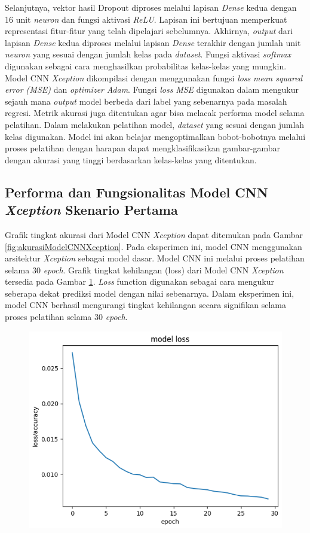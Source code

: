 Selanjutnya, vektor hasil Dropout diproses melalui lapisan \textit{Dense} kedua dengan 16 unit \textit{neuron} dan fungsi aktivasi \textit{ReLU}. Lapisan ini bertujuan memperkuat representasi fitur-fitur yang telah dipelajari sebelumnya. Akhirnya, \textit{output} dari lapisan \textit{Dense} kedua diproses melalui lapisan \textit{Dense} terakhir dengan jumlah unit \textit{neuron} yang sesuai dengan jumlah kelas pada \textit{dataset}. Fungsi aktivasi \textit{softmax} digunakan sebagai cara menghasilkan probabilitas kelas-kelas yang mungkin. Model CNN \textit{Xception} dikompilasi dengan menggunakan fungsi \textit{loss} \textit{mean squared error (MSE)} dan \textit{optimizer} \textit{Adam}. Fungsi \textit{loss} \textit{MSE} digunakan dalam mengukur sejauh mana \textit{output} model berbeda dari label yang sebenarnya pada masalah regresi. Metrik akurasi juga ditentukan agar bisa melacak performa model selama pelatihan. Dalam melakukan pelatihan model, \textit{dataset} yang sesuai dengan jumlah kelas digunakan. Model ini akan belajar mengoptimalkan bobot-bobotnya melalui proses pelatihan dengan harapan dapat mengklasifikasikan gambar-gambar dengan akurasi yang tinggi berdasarkan kelas-kelas yang ditentukan.

\subsection*{Performa dan Fungsionalitas Model CNN \textit{Xception} Skenario Pertama}

Grafik tingkat akurasi dari Model CNN \textit{Xception} dapat ditemukan pada Gambar \ref{fig:akurasiModelCNNXception}. Pada eksperimen ini, model CNN menggunakan arsitektur \textit{Xception} sebagai model dasar. Model CNN ini melalui proses pelatihan selama 30\textit{ epoch}. Grafik tingkat kehilangan (loss) dari Model CNN \textit{Xception} tersedia pada Gambar \ref{fig:lossModelCNNXception}. \textit{Loss} function digunakan sebagai cara mengukur seberapa dekat prediksi model dengan nilai sebenarnya. Dalam eksperimen ini, model CNN berhasil mengurangi tingkat kehilangan secara signifikan selama proses pelatihan selama 30\textit{ epoch}.

\begin{figure}[!hbt]
	\centering
	\includegraphics[width=0.7\linewidth]{gambar/bener/Loss_ModelXception.png}
	\label{fig:lossModelCNNXception}
\end{figure}


